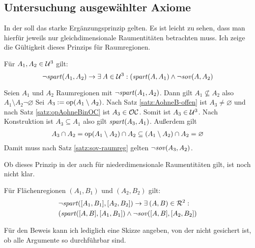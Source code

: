 \subsection{Untersuchung ausgewählter Axiome}

    In der \strukt soll das starke Ergänzungsprinzip gelten. 
    Es ist leicht zu sehen, dass man hierfür jeweils nur gleichdimensionale Raumentitäten betrachten muss.
    Ich zeige die Gültigkeit dieses Prinzips für Raumregionen.
    \begin{satz}
        Für $A_1,A_2 \in \mathcal{U}^3$ gilt: 
        $$\neg \mathit{spart}(A_1,A_2) \to \exists\: A \in  \mathcal{U}^3: (\mathit{spart}(A,A_1) \wedge \neg \mathit{sov}(A,A_2)$$
    \end{satz}
    \begin{bew}
        Seien $A_1$ und $A_2$ Raumregionen mit $\neg \mathit{spart}(A_1,A_2)$.
        Dann gilt $A_1 \nsubseteq A_2$ also $A_1 \setminus A_2 \neg \varnothing$
        Sei $A_3 := \text{op}(A_1 \setminus A_2)$.
        Nach Satz \ref{satz:AohneB-offen} ist $A_3 \neq \varnothing$ und nach Satz \ref{satz:opAohneBinOC} ist $A_3 \in \mathcal{OC}$.
        Somit ist $A_3 \in \mathcal{U}^3$.
        Nach Konstruktion ist $A_3 \subseteq A_1$ also gilt $\mathit{spart}(A_3,A_1)$.
        Außerdem gilt
        \begin{align*}
            A_3 \cap A_2 
            = \text{op}(A_1 \setminus A_2) \cap A_2 
            \subseteq (A_1 \setminus A_2) \cap A_2 
            = \varnothing
        \end{align*}
        Damit muss nach Satz \ref{satz:sov-raumreg} gelten $\neg \mathit{sov}(A_3,A_2)$.
    \end{bew}
    Ob dieses Prinzip in der \strukt auch für niederdimensionale Raumentitäten gilt, ist noch nicht klar.
    \begin{hyp}
        Für Flächenregionen $(A_1,B_1)$ und $(A_2,B_2)$ gilt: 
        \begin{align*}
            &\neg \mathit{spart}([A_1,B_1],[A_2,B_2]) \to \exists\: (A,B) \in  \mathcal{R}^2:\\
            &(\mathit{spart}([A,B],[A_1,B_1]) \wedge \neg \mathit{sov}([A,B],[A_2,B_2])
        \end{align*}
    \end{hyp}
    Für den Beweis kann ich lediglich eine Skizze angeben, von der nicht gesichert ist, ob alle Argumente so durchführbar sind.
